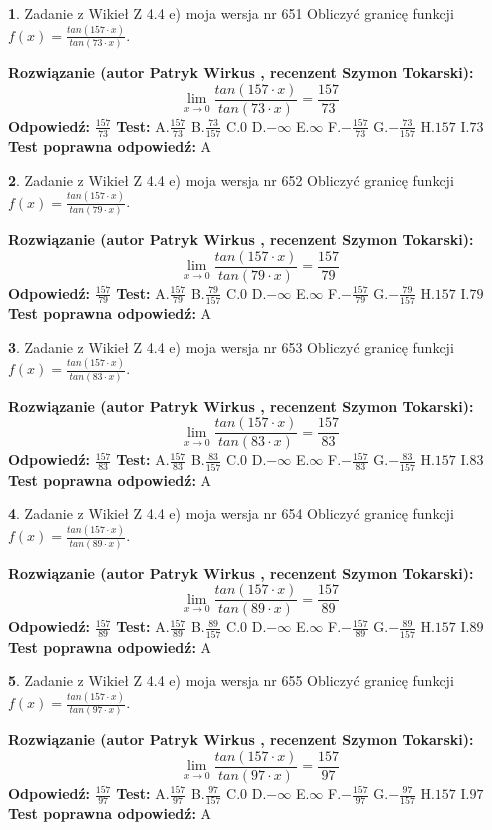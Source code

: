\documentclass[12pt, a4paper]{article}
\theoremstyle{definition} %
\newtheorem{zad}{}
\newcommand{\zadStart}[1]{\begin{zad}#1\newline}
\newcommand{\zadStop}{\end{zad}}
\newcommand{\rozwStart}[2]{\noindent \textbf{Rozwiązanie (autor #1 , recenzent #2): }\newline}
\newcommand{\rozwStop}{\newline}
\newcommand{\odpStart}{\noindent \textbf{Odpowiedź:}\newline}
\newcommand{\odpStop}{\newline}
\newcommand{\testStart}{\noindent \textbf{Test:}\newline}
\newcommand{\testStop}{\newline}
\newcommand{\kluczStart}{\noindent \textbf{Test poprawna odpowiedź:}\newline}
\newcommand{\kluczStop}{\newline}
\begin{document}
\zadStart{Zadanie z Wikieł Z 4.4 e) moja wersja nr 651}
Obliczyć granicę funkcji $f(x)=\frac{tan(157\cdot x)}{tan(73\cdot x)}$.
\zadStop
\rozwStart{Patryk Wirkus}{Szymon Tokarski}
$$\lim\limits_{x\to 0}\frac{tan(157\cdot x)}{tan(73\cdot x)}=
\frac{157}{73}$$
\rozwStop
\odpStart
$\frac{157}{73}$
\odpStop
\testStart
A.$\frac{157}{73}$
B.$\frac{73}{157}$
C.$0$
D.$-\infty$
E.$\infty$
F.$-\frac{157}{73}$
G.$-\frac{73}{157}$
H.$157$
I.$73$
\testStop
\kluczStart
A
\kluczStop



\zadStart{Zadanie z Wikieł Z 4.4 e) moja wersja nr 652}
Obliczyć granicę funkcji $f(x)=\frac{tan(157\cdot x)}{tan(79\cdot x)}$.
\zadStop
\rozwStart{Patryk Wirkus}{Szymon Tokarski}
$$\lim\limits_{x\to 0}\frac{tan(157\cdot x)}{tan(79\cdot x)}=
\frac{157}{79}$$
\rozwStop
\odpStart
$\frac{157}{79}$
\odpStop
\testStart
A.$\frac{157}{79}$
B.$\frac{79}{157}$
C.$0$
D.$-\infty$
E.$\infty$
F.$-\frac{157}{79}$
G.$-\frac{79}{157}$
H.$157$
I.$79$
\testStop
\kluczStart
A
\kluczStop



\zadStart{Zadanie z Wikieł Z 4.4 e) moja wersja nr 653}
Obliczyć granicę funkcji $f(x)=\frac{tan(157\cdot x)}{tan(83\cdot x)}$.
\zadStop
\rozwStart{Patryk Wirkus}{Szymon Tokarski}
$$\lim\limits_{x\to 0}\frac{tan(157\cdot x)}{tan(83\cdot x)}=
\frac{157}{83}$$
\rozwStop
\odpStart
$\frac{157}{83}$
\odpStop
\testStart
A.$\frac{157}{83}$
B.$\frac{83}{157}$
C.$0$
D.$-\infty$
E.$\infty$
F.$-\frac{157}{83}$
G.$-\frac{83}{157}$
H.$157$
I.$83$
\testStop
\kluczStart
A
\kluczStop



\zadStart{Zadanie z Wikieł Z 4.4 e) moja wersja nr 654}
Obliczyć granicę funkcji $f(x)=\frac{tan(157\cdot x)}{tan(89\cdot x)}$.
\zadStop
\rozwStart{Patryk Wirkus}{Szymon Tokarski}
$$\lim\limits_{x\to 0}\frac{tan(157\cdot x)}{tan(89\cdot x)}=
\frac{157}{89}$$
\rozwStop
\odpStart
$\frac{157}{89}$
\odpStop
\testStart
A.$\frac{157}{89}$
B.$\frac{89}{157}$
C.$0$
D.$-\infty$
E.$\infty$
F.$-\frac{157}{89}$
G.$-\frac{89}{157}$
H.$157$
I.$89$
\testStop
\kluczStart
A
\kluczStop



\zadStart{Zadanie z Wikieł Z 4.4 e) moja wersja nr 655}
Obliczyć granicę funkcji $f(x)=\frac{tan(157\cdot x)}{tan(97\cdot x)}$.
\zadStop
\rozwStart{Patryk Wirkus}{Szymon Tokarski}
$$\lim\limits_{x\to 0}\frac{tan(157\cdot x)}{tan(97\cdot x)}=
\frac{157}{97}$$
\rozwStop
\odpStart
$\frac{157}{97}$
\odpStop
\testStart
A.$\frac{157}{97}$
B.$\frac{97}{157}$
C.$0$
D.$-\infty$
E.$\infty$
F.$-\frac{157}{97}$
G.$-\frac{97}{157}$
H.$157$
I.$97$
\testStop
\kluczStart
A
\kluczStop
\end{document}
